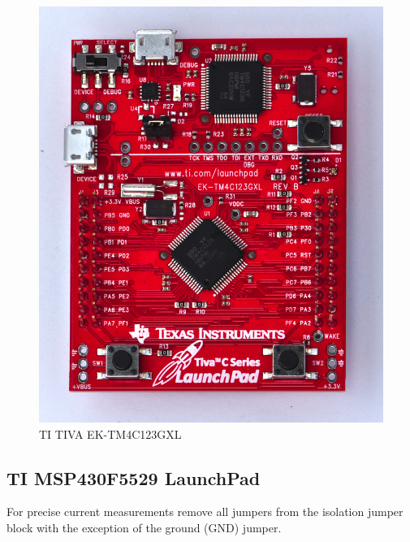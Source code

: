 \documentclass[twoside,11pt]{cergdoc}
\begin{document}
\begin{figure}[ht]
  \begin{center}
    \includegraphics[scale=0.6]{figures/ek-tm4c123gxl}
    \caption{TI TIVA EK-TM4C123GXL}\label{fig:tiva}
  \end{center}
\vspace{-1ex}
\end{figure}


\subsection{TI MSP430F5529 LaunchPad\texttrademark}

For precise current measurements remove all jumpers from the isolation jumper block 
with the exception of the ground (GND) jumper. 
\end{document}
